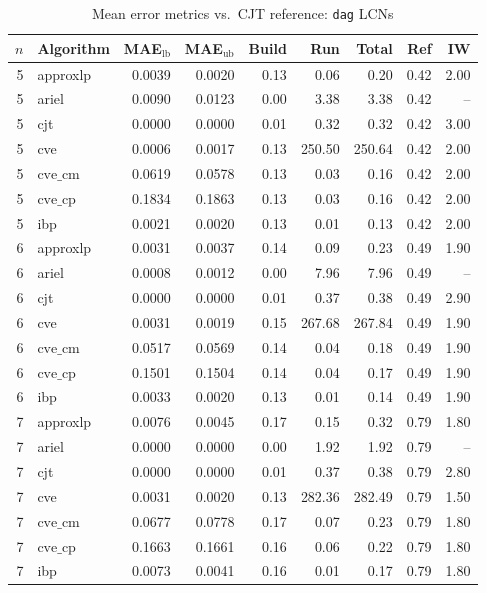 \documentclass{article}
\begin{document}
\begin{table}[ht]
\centering
\caption{Mean error metrics vs.\ CJT reference: \texttt{dag} LCNs}
\begin{tabular}{rlrrrrrrr}
\toprule
 $n$ & Algorithm & MAE$_{\text{lb}}$ & MAE$_{\text{ub}}$ & Build & Run & Total & Ref & IW \\
\midrule
 5 & approxlp & 0.0039 & 0.0020 & 0.13 & 0.06 & 0.20 & 0.42 & 2.00 \\
 5 & ariel & 0.0090 & 0.0123 & 0.00 & 3.38 & 3.38 & 0.42 & -- \\
 5 & cjt & 0.0000 & 0.0000 & 0.01 & 0.32 & 0.32 & 0.42 & 3.00 \\
 5 & cve & 0.0006 & 0.0017 & 0.13 & 250.50 & 250.64 & 0.42 & 2.00 \\
 5 & $\text{cve\_cm}$ & 0.0619 & 0.0578 & 0.13 & 0.03 & 0.16 & 0.42 & 2.00 \\
 5 & $\text{cve\_cp}$ & 0.1834 & 0.1863 & 0.13 & 0.03 & 0.16 & 0.42 & 2.00 \\
 5 & ibp & 0.0021 & 0.0020 & 0.13 & 0.01 & 0.13 & 0.42 & 2.00 \\
\hline
 6 & approxlp & 0.0031 & 0.0037 & 0.14 & 0.09 & 0.23 & 0.49 & 1.90 \\
 6 & ariel & 0.0008 & 0.0012 & 0.00 & 7.96 & 7.96 & 0.49 & -- \\
 6 & cjt & 0.0000 & 0.0000 & 0.01 & 0.37 & 0.38 & 0.49 & 2.90 \\
 6 & cve & 0.0031 & 0.0019 & 0.15 & 267.68 & 267.84 & 0.49 & 1.90 \\
 6 & $\text{cve\_cm}$ & 0.0517 & 0.0569 & 0.14 & 0.04 & 0.18 & 0.49 & 1.90 \\
 6 & $\text{cve\_cp}$ & 0.1501 & 0.1504 & 0.14 & 0.04 & 0.17 & 0.49 & 1.90 \\
 6 & ibp & 0.0033 & 0.0020 & 0.13 & 0.01 & 0.14 & 0.49 & 1.90 \\
\hline
 7 & approxlp & 0.0076 & 0.0045 & 0.17 & 0.15 & 0.32 & 0.79 & 1.80 \\
 7 & ariel & 0.0000 & 0.0000 & 0.00 & 1.92 & 1.92 & 0.79 & -- \\
 7 & cjt & 0.0000 & 0.0000 & 0.01 & 0.37 & 0.38 & 0.79 & 2.80 \\
 7 & cve & 0.0031 & 0.0020 & 0.13 & 282.36 & 282.49 & 0.79 & 1.50 \\
 7 & $\text{cve\_cm}$ & 0.0677 & 0.0778 & 0.17 & 0.07 & 0.23 & 0.79 & 1.80 \\
 7 & $\text{cve\_cp}$ & 0.1663 & 0.1661 & 0.16 & 0.06 & 0.22 & 0.79 & 1.80 \\
 7 & ibp & 0.0073 & 0.0041 & 0.16 & 0.01 & 0.17 & 0.79 & 1.80 \\

\end{tabular}
\end{table}
\end{document}

